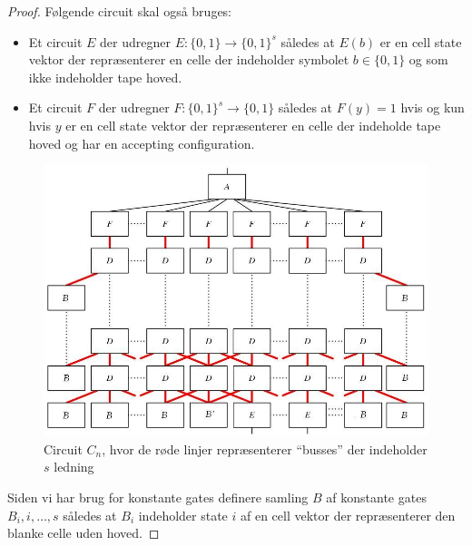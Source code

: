 \begin{itemize}
\begin{proof}
    Følgende circuit skal også bruges:
    \begin{itemize}
    	\item Et circuit $E$ der udregner $E: \{0,1\} \rightarrow \{0,1\}^s$ således at $E(b)$ er en cell state vektor der repræsenterer en celle der indeholder symbolet $b \in \{0,1\}$ og som ikke indeholder tape hoved. 
    	\item Et circuit $F$ der udregner $F: \{0,1\}^s \rightarrow \{0,1\}$ således at $F(y) = 1$ hvis og kun hvis $y$ er en cell state vektor der repræsenterer en celle der indeholde tape hoved og har en accepting configuration. 
   \end{itemize}
    \begin{figure}[h]
    	\centering
    	\includegraphics[width=\linewidth]{img/gates_proof}
    	\caption{Circuit $C_n$, hvor de røde linjer repræsenterer ``busses'' der indeholder $s$ ledning \label{gates-proof}}
    \end{figure}
  Siden vi har brug for konstante gates definere samling $B$ af konstante gates $B_i, i, \dots,s$ således at $B_i$ indeholder state $i$ af en cell vektor der repræsenterer den blanke celle uden hoved. \smallskip
  

\end{proof}
\end{itemize}
